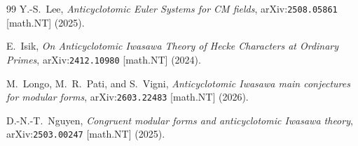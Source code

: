 \documentclass[12pt]{amsart}
\theoremstyle{definition}
\begin{document}
\begin{thebibliography}{99}
Y.-S.~Lee,
\emph{Anticyclotomic Euler Systems for CM fields},
arXiv:\texttt{2508.05861} [math.NT] (2025).

E.~Isik,
\emph{On Anticyclotomic Iwasawa Theory of Hecke Characters at Ordinary Primes},
arXiv:\texttt{2412.10980} [math.NT] (2024).

M.~Longo, M.~R.~Pati, and S.~Vigni,
\emph{Anticyclotomic Iwasawa main conjectures for modular forms},
arXiv:\texttt{2603.22483} [math.NT] (2026).

D.-N.-T.~Nguyen,
\emph{Congruent modular forms and anticyclotomic Iwasawa theory},
arXiv:\texttt{2503.00247} [math.NT] (2025).

\end{thebibliography}
\end{document}
